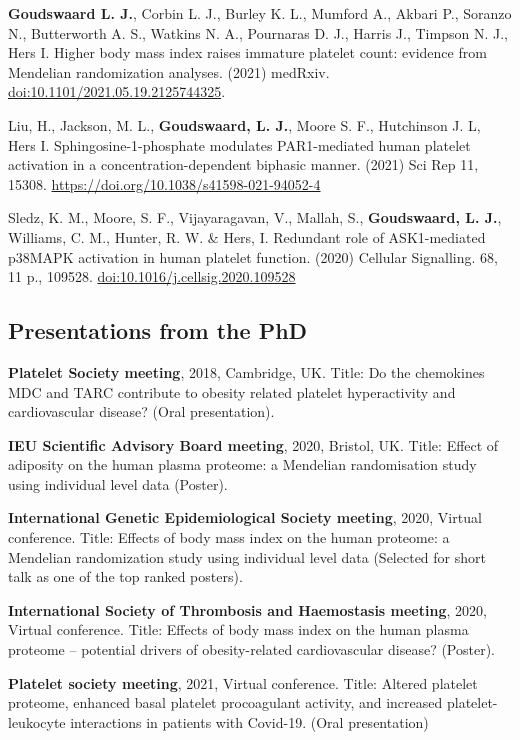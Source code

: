 \documentclass[11pt,twoside]{bristolthesis}
\begin{document}
\textbf{Goudswaard L. J.}, Corbin L. J., Burley K. L., Mumford A., Akbari P., Soranzo N., Butterworth A. S., Watkins N. A., Pournaras D. J., Harris J., Timpson N. J., Hers I. Higher body mass index raises immature platelet count: evidence from Mendelian randomization analyses. (2021) medRxiv. \url{doi:10.1101/2021.05.19.2125744325}.

Liu, H., Jackson, M. L., \textbf{Goudswaard, L. J.}, Moore S. F., Hutchinson J. L, Hers I. Sphingosine-1-phosphate modulates PAR1-mediated human platelet activation in a concentration-dependent biphasic manner. (2021) Sci Rep 11, 15308. \url{https://doi.org/10.1038/s41598-021-94052-4}

Sledz, K. M., Moore, S. F., Vijayaragavan, V., Mallah, S., \textbf{Goudswaard, L. J.}, Williams, C. M., Hunter, R. W. \& Hers, I. Redundant role of ASK1-mediated p38MAPK activation in human platelet function. (2020) Cellular Signalling. 68, 11 p., 109528. \url{doi:10.1016/j.cellsig.2020.109528}

\hypertarget{presentations-from-the-phd}{%
\subsection{Presentations from the PhD}\label{presentations-from-the-phd}}

\textbf{Platelet Society meeting}, 2018, Cambridge, UK. Title: Do the chemokines MDC and TARC contribute to obesity related platelet hyperactivity and cardiovascular disease? (Oral presentation).

\textbf{IEU Scientific Advisory Board meeting}, 2020, Bristol, UK. Title: Effect of adiposity on the human plasma proteome: a Mendelian randomisation study using individual level data (Poster).

\textbf{International Genetic Epidemiological Society meeting}, 2020, Virtual conference. Title: Effects of body mass index on the human proteome: a Mendelian randomization study using individual level data (Selected for short talk as one of the top ranked posters).

\textbf{International Society of Thrombosis and Haemostasis meeting}, 2020, Virtual conference. Title: Effects of body mass index on the human plasma proteome -- potential drivers of obesity-related cardiovascular disease? (Poster).

\textbf{Platelet society meeting}, 2021, Virtual conference. Title: Altered platelet proteome, enhanced basal platelet procoagulant activity, and increased platelet-leukocyte interactions in patients with Covid-19. (Oral presentation)
\end{document}
